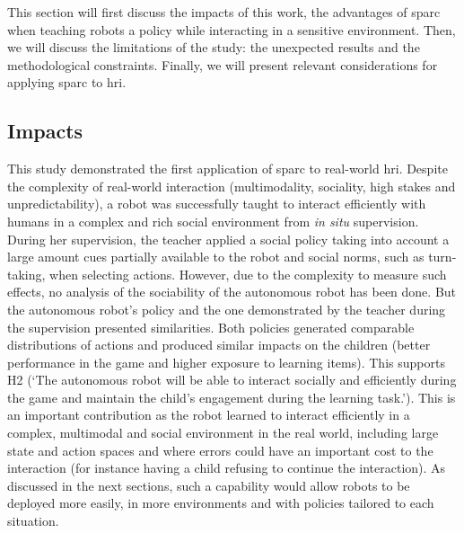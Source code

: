 This section will first discuss the impacts of this work, the advantages of \gls{sparc} when teaching robots a policy while interacting in a sensitive environment. Then, we will discuss the limitations of the study: the unexpected results and the methodological constraints. Finally, we will present relevant considerations for applying \gls{sparc} to \gls{hri}.

\subsection{Impacts} \label{sec:tuto_impacts}



This study demonstrated the first application of \gls{sparc} to real-world \gls{hri}. Despite the complexity of real-world interaction (multimodality, sociality, high stakes and unpredictability), a robot was successfully taught to interact efficiently with humans in a complex and rich social environment from \textit{in situ} supervision. During her supervision, the teacher applied a social policy taking into account a large amount cues partially available to the robot and social norms, such as turn-taking, when selecting actions. However, due to the complexity to measure such effects, no analysis of the sociability of the autonomous robot has been done. But the autonomous robot's policy and the one demonstrated by the teacher during the supervision presented similarities. Both policies generated comparable distributions of actions and produced similar impacts on the children (better performance in the game and higher exposure to learning items). 
This supports H2 (`The autonomous robot will be able to interact socially and efficiently during the game and maintain the child's engagement during the learning task.'). 
This is an important contribution as the robot learned to interact efficiently in a complex, multimodal and social environment in the real world, including large state and action spaces and where errors could have an important cost to the interaction (for instance having a child refusing to continue the interaction). As discussed in the next sections, such a capability would allow robots to be deployed more easily, in more environments and with policies tailored to each situation.%

